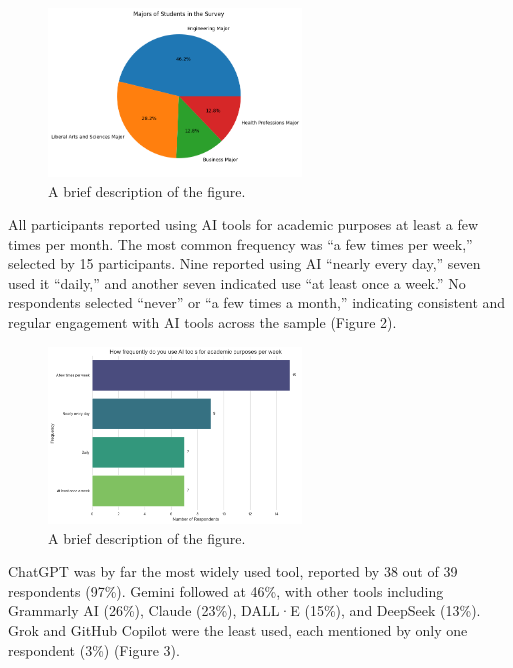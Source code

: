 \documentclass[12pt]{article}
\begin{document}
\begin{figure}[htbp]
  \centering
  \includegraphics[width=0.6\textwidth]{fig1.png} %
  \caption{A brief description of the figure.}
  \label{fig:example1}
\end{figure}

All participants reported using AI tools for academic purposes at least a few times per month. The most common frequency was “a few times per week,” selected by 15 participants. Nine reported using AI “nearly every day,” seven used it “daily,” and another seven indicated use “at least once a week.” No respondents selected “never” or “a few times a month,” indicating consistent and regular engagement with AI tools across the sample (Figure 2).

\begin{figure}[htbp]
  \centering
  \includegraphics[width=0.6\textwidth]{fig2.png} %
  \caption{A brief description of the figure.}
  \label{fig:example1}
\end{figure}

ChatGPT was by far the most widely used tool, reported by 38 out of 39 respondents (97\%). Gemini followed at 46\%, with other tools including Grammarly AI (26\%), Claude (23\%), DALL·E (15\%), and DeepSeek (13\%). Grok and GitHub Copilot were the least used, each mentioned by only one respondent (3\%) (Figure 3).
\end{document}
